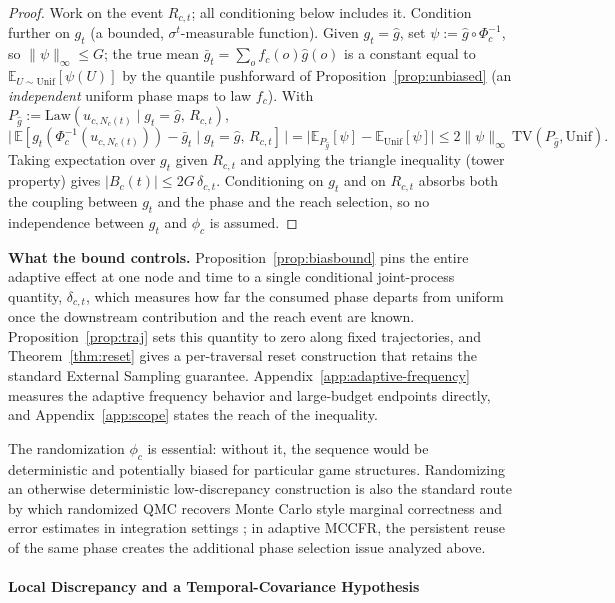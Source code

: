 \documentclass[11pt]{article}
\begin{document}
\begin{proof}
Work on the event $R_{c,t}$; all conditioning below includes it. Condition further on $g_t$ (a bounded, $\sigma^t$-measurable function). Given $g_t=\hat g$, set $\psi:=\hat g\circ\Phi_c^{-1}$, so $\|\psi\|_\infty\le G$; the true mean $\bar g_t=\sum_o f_c(o)\hat g(o)$ is a constant equal to $\mathbb{E}_{U\sim\mathrm{Unif}}[\psi(U)]$ by the quantile pushforward of Proposition~\ref{prop:unbiased} (an \emph{independent} uniform phase maps to law $f_c$). With $P_{\hat g}:=\mathrm{Law}(u_{c,N_c(t)}\mid g_t=\hat g,\,R_{c,t})$,
\[
\big|\,\mathbb{E}[g_t(\Phi_c^{-1}(u_{c,N_c(t)}))-\bar g_t\mid g_t=\hat g,\,R_{c,t}]\,\big|
=\big|\mathbb{E}_{P_{\hat g}}[\psi]-\mathbb{E}_{\mathrm{Unif}}[\psi]\big|
\le 2\|\psi\|_\infty\,\mathrm{TV}(P_{\hat g},\mathrm{Unif}).
\]
Taking expectation over $g_t$ given $R_{c,t}$ and applying the triangle inequality (tower property) gives $|B_c(t)|\le 2G\,\delta_{c,t}$. Conditioning on $g_t$ and on $R_{c,t}$ absorbs both the coupling between $g_t$ and the phase and the reach selection, so no independence between $g_t$ and $\phi_c$ is assumed.
\end{proof}

\textbf{What the bound controls.} Proposition~\ref{prop:biasbound} pins the entire adaptive effect at one node and time to a single conditional joint-process quantity, $\delta_{c,t}$, which measures how far the consumed phase departs from uniform once the downstream contribution and the reach event are known. Proposition~\ref{prop:traj} sets this quantity to zero along fixed trajectories, and Theorem~\ref{thm:reset} gives a per-traversal reset construction that retains the standard External Sampling guarantee. Appendix~\ref{app:adaptive-frequency} measures the adaptive frequency behavior and large-budget endpoints directly, and Appendix~\ref{app:scope} states the reach of the inequality.

The randomization $\phi_c$ is essential: without it, the sequence would be deterministic and potentially biased for particular game structures. Randomizing an otherwise deterministic low-discrepancy construction is also the standard route by which randomized QMC recovers Monte Carlo style marginal correctness and error estimates in integration settings \citep{cranley1976randomization,owen1997monte}; in adaptive MCCFR, the persistent reuse of the same phase creates the additional phase selection issue analyzed above.

\paragraph{Local Discrepancy and a Temporal-Covariance Hypothesis}
\end{document}
